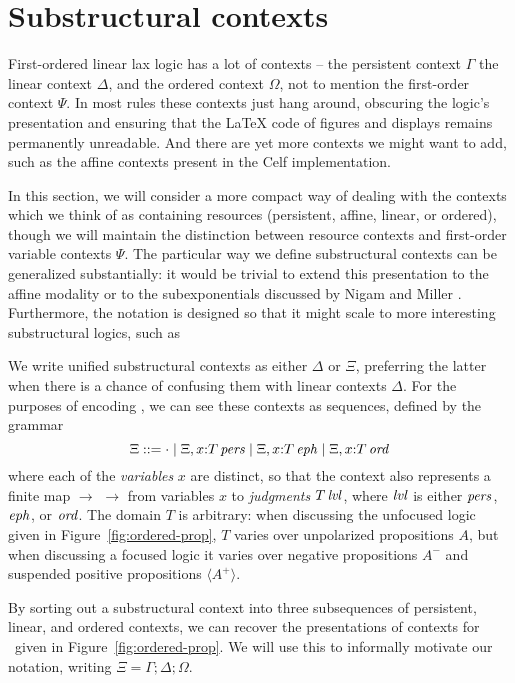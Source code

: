 \section{Substructural contexts}
\label{sec:contexts}

First-ordered linear lax logic has a lot of contexts -- the persistent
context $\Gamma$ the linear context $\Delta$, and the ordered context
$\Omega$, not to mention the first-order context $\Psi$. In most rules
these contexts just hang around, obscuring the logic's presentation
and ensuring that the {\LaTeX} code of figures and displays remains
permanently unreadable. And there are yet more contexts we might want to 
add, such as the affine contexts present in the Celf implementation.

In this section, we will consider a more compact way of dealing with
the contexts which we think of as containing resources (persistent,
affine, linear, or ordered), though we will maintain the distinction
between resource contexts and first-order variable 
contexts $\Psi$.  The particular way we define substructural contexts
can be generalized substantially: it would be trivial to extend
this presentation to the affine modality or to the subexponentials
discussed by Nigam and Miller \cite{nigam09algorithmic}. Furthermore,
the notation is designed so that it might scale to more interesting
substructural logics, such as 



We write unified substructural contexts as either $\Delta$ or $\Xi$,
preferring the latter when there is a chance of confusing them with
linear contexts $\Delta$. For the purposes of encoding \ollll, we can
see these contexts as sequences, defined by the grammar
\[
\Xi ::= \cdot 
  \mid \Xi, x{:}{T}\,{{\it pers}}
  \mid \Xi, x{:}{T}\,{{\it eph}}
  \mid \Xi, x{:}{T}\,{{\it ord}}
\]
where each of the {\em variables} $x$ are distinct, so that the context
also represents a finite map $\to$ $\rightarrow$ from variables $x$ to 
{\it judgments}
${T}\,{{\it lvl}}$, where ${\it lvl}$ is either ${\it pers}$, ${\it eph}$, or ${\it ord}$. 
The domain $T$ is arbitrary: when
discussing the unfocused logic given in Figure~\ref{fig:ordered-prop},
$T$ varies over unpolarized propositions $A$, but when discussing a
focused logic it varies over negative propositions $A^-$ and suspended
positive propositions $\langle A^+ \rangle$. 

By sorting out a substructural context into three subsequences of
persistent, linear, and ordered contexts, we can recover the
presentations of contexts for \ollll~given in
Figure~\ref{fig:ordered-prop}. We will use this to informally motivate
our notation, writing $\Xi = \Gamma; \Delta; \Omega$.


